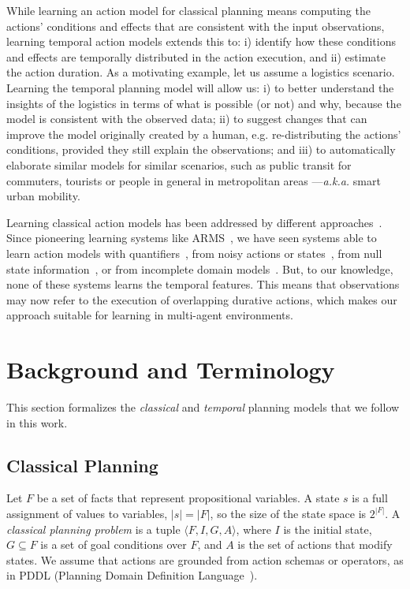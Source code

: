 \documentclass[runningheads]{llncs}
\newcommand{\tup}[1]{{\langle #1 \rangle}}
\begin{document}
While learning an action model for classical planning means computing the actions' conditions and effects that are consistent with the input observations, learning temporal action models extends this to: i) identify how these conditions and effects are temporally distributed in the action execution, and ii) estimate the action duration. As a motivating example, let us assume a logistics scenario. Learning the temporal planning model will allow us: i) to better understand the insights of the logistics in terms of what is possible (or not) and why, because the model is consistent with the observed data; ii) to suggest changes that can improve the model originally created by a human, e.g. re-distributing the actions' conditions, provided they still explain the observations; and iii) to automatically elaborate
similar models for similar scenarios, such as public transit for commuters, tourists or people in general in metropolitan areas ---\emph{a.k.a.} smart urban mobility.


Learning classical action models has been addressed by different approaches~\cite{arora2018review}. Since pioneering learning systems like ARMS~\cite{yang2007learning}, we have seen systems able to learn action models with quantifiers~\cite{AmirC08,ZhuoYHL10}, from noisy actions or states~\cite{MouraoZPS12,zhuo2013action}, from null state information~\cite{cresswell2013acquiring}, or from incomplete domain models~\cite{ZhuoK17,ZhuoNK13}. But, to our knowledge, none of these systems learns the temporal features. This means that observations may now refer to the execution of overlapping durative actions, which makes our approach suitable for learning in multi-agent environments.



\section{Background and Terminology}
\label{sec:background}

This section formalizes the {\em classical} and {\em temporal} planning models that we follow in this work.


\subsection{Classical Planning}
\label{sec:classicalplanning}


Let $F$ be a set of facts that represent propositional variables.
A state $s$ is a full assignment of values to variables, $|s|=|F|$, so the size of the state space is $2^{|F|}$.
A {\em classical planning problem} is a tuple $\tup{F,I,G,A}$, where $I$ is the initial state, $G \subseteq F$ is a set of goal conditions over $F$, and $A$ is the set of actions that modify states. We assume that actions are grounded from action schemas or operators, as in PDDL (Planning Domain Definition Language~\cite{fox2003pddl2,ghallab2004automated}).
\end{document}

